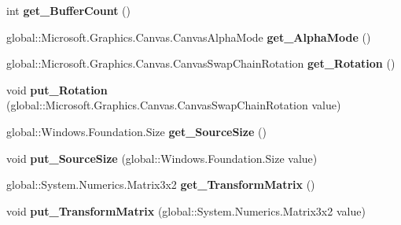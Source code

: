 \begin{DoxyCompactItemize}
int {\bfseries get\+\_\+\+Buffer\+Count} ()
\item 
\mbox{\label{interface_microsoft_1_1_graphics_1_1_canvas_1_1_i_canvas_swap_chain_aec4483702807638006acc34e237b1e23}} 
global\+::\+Microsoft.\+Graphics.\+Canvas.\+Canvas\+Alpha\+Mode {\bfseries get\+\_\+\+Alpha\+Mode} ()
\item 
\mbox{\label{interface_microsoft_1_1_graphics_1_1_canvas_1_1_i_canvas_swap_chain_a8e56717493f8cd2abe583fe0b23dbc81}} 
global\+::\+Microsoft.\+Graphics.\+Canvas.\+Canvas\+Swap\+Chain\+Rotation {\bfseries get\+\_\+\+Rotation} ()
\item 
\mbox{\label{interface_microsoft_1_1_graphics_1_1_canvas_1_1_i_canvas_swap_chain_a931e117cf8d541e0154abccf052807fb}} 
void {\bfseries put\+\_\+\+Rotation} (global\+::\+Microsoft.\+Graphics.\+Canvas.\+Canvas\+Swap\+Chain\+Rotation value)
\item 
\mbox{\label{interface_microsoft_1_1_graphics_1_1_canvas_1_1_i_canvas_swap_chain_ae2841a44387495cf2aecbadd50cae216}} 
global\+::\+Windows.\+Foundation.\+Size {\bfseries get\+\_\+\+Source\+Size} ()
\item 
\mbox{\label{interface_microsoft_1_1_graphics_1_1_canvas_1_1_i_canvas_swap_chain_a2d4805496ff1ec4619b1157a60720971}} 
void {\bfseries put\+\_\+\+Source\+Size} (global\+::\+Windows.\+Foundation.\+Size value)
\item 
\mbox{\label{interface_microsoft_1_1_graphics_1_1_canvas_1_1_i_canvas_swap_chain_ad0ee43ededec68f0e33cd0f0ce1cbb35}} 
global\+::\+System.\+Numerics.\+Matrix3x2 {\bfseries get\+\_\+\+Transform\+Matrix} ()
\item 
\mbox{\label{interface_microsoft_1_1_graphics_1_1_canvas_1_1_i_canvas_swap_chain_a28c5d9ed4784f66f247e9176d9ab4e33}} 
void {\bfseries put\+\_\+\+Transform\+Matrix} (global\+::\+System.\+Numerics.\+Matrix3x2 value)

\end{DoxyCompactItemize}
